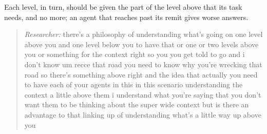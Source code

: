 {\color{blue}Each level, in turn, should be given the part of the level above that its task needs, and no more; an agent that reaches past its remit gives worse answers.}


\begin{quote}\small
{\footnotesize\textit{Researcher:} there's a philosophy of understanding what's going on one level above you and one level below you to have that or one or two levels above you or something for the context right so you you get told to go and i don't know um recce that road you need to know why you're wrecking that road so there's something above right and the idea that actually you need to have each of your agents in this in this scenario understanding the context a little above them i understand what you're saying that you don't want them to be thinking about the super wide context but is there an advantage to that linking up of understanding what's a little way up above you}\par\smallskip

\end{quote}

